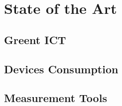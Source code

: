 

\chapter{State of the Art} \label{chap2:state_of_the_art}
\section{Greent ICT} \label{sec2:green_ict}
\section{Devices Consumption} \label{sec2:devices_consumption} 
\section{Measurement Tools} \label{sec2:tools}

